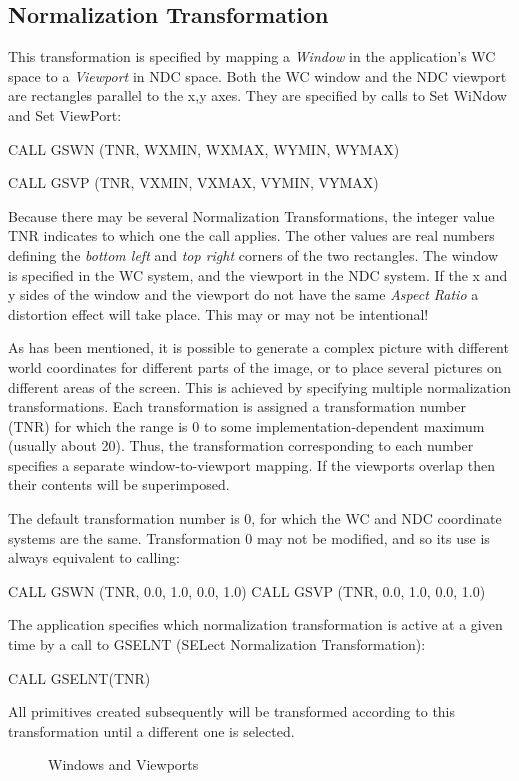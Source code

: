 \subsection{\protect\label{sec:nortrn}Normalization Transformation}
 
This transformation is specified by mapping a {\it Window}
in the application's WC space to a {\it Viewport} in NDC space.
Both the WC window and the NDC viewport are rectangles parallel to the
x,y axes.
They are specified by calls to Set WiNdow and Set ViewPort:
\begin{XMP}
CALL GSWN (TNR, WXMIN, WXMAX, WYMIN, WYMAX)
 
CALL GSVP (TNR, VXMIN, VXMAX, VYMIN, VYMAX)
\end{XMP}
Because there may be several Normalization Transformations, the integer
value TNR indicates to which one the call applies.
The other values are real numbers defining the {\it bottom left} and
{\it top right} corners of the two rectangles. The window is
specified in the WC system, and the viewport in the NDC system. If the
x and y sides of the window and the viewport do not have the same
{\it Aspect Ratio} a distortion effect will take place.
This may or may not be intentional!
 
As has been mentioned, it is possible to generate a complex picture
with different world coordinates for different parts of the image,
or to place several pictures on different areas of the screen.
This is achieved by specifying multiple normalization transformations.
Each transformation is assigned a transformation number (TNR) for which
the range is 0 to some implementation-dependent maximum (usually about 20).
Thus, the transformation corresponding to each number
specifies a separate window-to-viewport mapping.
If the viewports overlap then their contents will be superimposed.
 
The default transformation number is 0, for which the WC and NDC
coordinate systems are the same.
Transformation 0 may not be modified, and so its use
is always equivalent to calling:
\begin{XMP}
CALL GSWN (TNR, 0.0, 1.0, 0.0, 1.0)
CALL GSVP (TNR, 0.0, 1.0, 0.0, 1.0)
\end{XMP}
 
The application specifies which normalization transformation is
active at a given time by a call to GSELNT (SELect Normalization
Transformation):
\begin{XMP}
CALL GSELNT(TNR)
\end{XMP}
All primitives created subsequently will be transformed according to this
transformation until a different one is selected.
\begin{figure}[h]
\caption{Windows and Viewports}
\label{fig:windows}
\end{figure}
